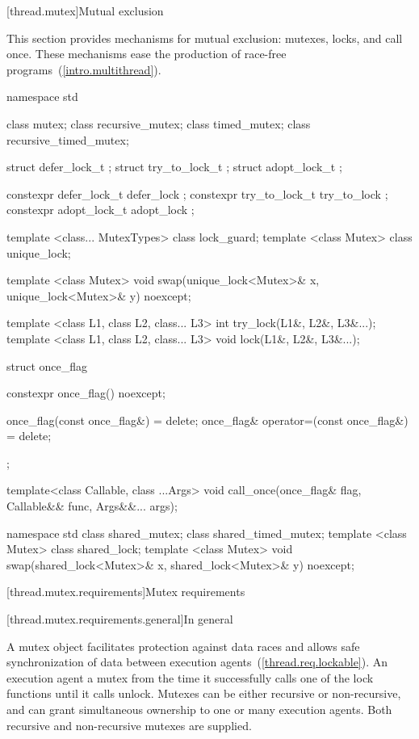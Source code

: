 [thread.mutex]{Mutual exclusion}

\pnum
This section provides mechanisms for mutual exclusion: mutexes, locks, and call
once. These mechanisms ease the production of race-free
programs~(\ref{intro.multithread}).

%

\begin{codeblock}
namespace std {
  class mutex;
  class recursive_mutex;
  class timed_mutex;
  class recursive_timed_mutex;

  struct defer_lock_t { };
  struct try_to_lock_t { };
  struct adopt_lock_t { };

  constexpr defer_lock_t  defer_lock { };
  constexpr try_to_lock_t try_to_lock { };
  constexpr adopt_lock_t  adopt_lock { };

  template <class... MutexTypes> class lock_guard;
  template <class Mutex> class unique_lock;

  template <class Mutex>
    void swap(unique_lock<Mutex>& x, unique_lock<Mutex>& y) noexcept;

  template <class L1, class L2, class... L3> int try_lock(L1&, L2&, L3&...);
  template <class L1, class L2, class... L3> void lock(L1&, L2&, L3&...);

  struct once_flag {
    constexpr once_flag() noexcept;

    once_flag(const once_flag&) = delete;
    once_flag& operator=(const once_flag&) = delete;
  };

  template<class Callable, class ...Args>
    void call_once(once_flag& flag, Callable&& func, Args&&... args);
}
\end{codeblock}

%

\begin{codeblock}
namespace std {
  class shared_mutex;
  class shared_timed_mutex;
  template <class Mutex> class shared_lock;
  template <class Mutex>
    void swap(shared_lock<Mutex>& x, shared_lock<Mutex>& y) noexcept;
}
\end{codeblock}

[thread.mutex.requirements]{Mutex requirements}

[thread.mutex.requirements.general]{In general}

\pnum
A mutex object facilitates protection against data races and allows safe synchronization of
data between execution agents~(\ref{thread.req.lockable}).
An execution agent  a mutex from the time it successfully calls one of the
lock functions until it calls unlock. Mutexes can be either recursive or non-recursive, and can
grant simultaneous ownership to one or many execution agents. Both
recursive and non-recursive mutexes are supplied.

